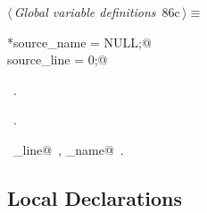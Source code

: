 \documentclass[a4paper]{report}
\begin{document}
\begin{flushleft} \small
\begin{minipage}{\linewidth}\label{scrap178}\raggedright\small
{} $\langle\,${\it Global variable definitions}\nobreak\ {\footnotesize {86c}}$\,\rangle\equiv$
\vspace{-1ex}
\begin{list}{}{} \item
\mbox{}\verb@char *source_name = NULL;@\\
\mbox{}\verb@int source_line = 0;@\\
\mbox{}\verb@@{\NWsep}
\end{list}
\vspace{-1.5ex}
\footnotesize
\begin{list}{}{\setlength{\itemsep}{-\parsep}\setlength{\itemindent}{-\leftmargin}}
\item \NWtxtMacroDefBy\ .
\item \NWtxtMacroRefIn\ .
\item \NWtxtIdentsUsed\nobreak\  \verb@source_line@\nobreak\ , \verb@source_name@\nobreak\ .
\item{}
\end{list}
\end{minipage}\vspace{4ex}
\end{flushleft}
\subsection{Local Declarations}
\end{document}
